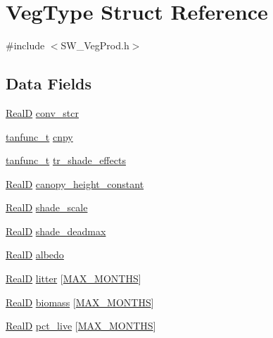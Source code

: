 \hypertarget{struct_veg_type}{}\section{Veg\+Type Struct Reference}
\label{struct_veg_type}


{\ttfamily \#include $<$S\+W\+\_\+\+Veg\+Prod.\+h$>$}

\subsection*{Data Fields}
\begin{DoxyCompactItemize}
\item 
\hyperlink{generic_8h_af1c105fd5732f70b91ddaeda0cc340e3}{RealD} \hyperlink{struct_veg_type_a5046a57c5d9c224a683182ee4c2997c4}{conv\+\_\+stcr}
\item 
\hyperlink{structtanfunc__t}{tanfunc\+\_\+t} \hyperlink{struct_veg_type_aac40e85a764b5b1efca9b21a8de7332a}{cnpy}
\item 
\hyperlink{structtanfunc__t}{tanfunc\+\_\+t} \hyperlink{struct_veg_type_af3afdd2c85788d6b6a4c1d91c0d3e483}{tr\+\_\+shade\+\_\+effects}
\item 
\hyperlink{generic_8h_af1c105fd5732f70b91ddaeda0cc340e3}{RealD} \hyperlink{struct_veg_type_a386cea6b73513d17ac0b87354922fd08}{canopy\+\_\+height\+\_\+constant}
\item 
\hyperlink{generic_8h_af1c105fd5732f70b91ddaeda0cc340e3}{RealD} \hyperlink{struct_veg_type_a81084955a7bb26a6856a846e53c1f9f0}{shade\+\_\+scale}
\item 
\hyperlink{generic_8h_af1c105fd5732f70b91ddaeda0cc340e3}{RealD} \hyperlink{struct_veg_type_aff715aa3ea34e7408699818553e6cc75}{shade\+\_\+deadmax}
\item 
\hyperlink{generic_8h_af1c105fd5732f70b91ddaeda0cc340e3}{RealD} \hyperlink{struct_veg_type_ac0050a00f702961caa7fead3d25485e9}{albedo}
\item 
\hyperlink{generic_8h_af1c105fd5732f70b91ddaeda0cc340e3}{RealD} \hyperlink{struct_veg_type_a88a2f9babc0cc68dbe22df58f193ccab}{litter} \mbox{[}\hyperlink{_times_8h_a9c97e6841188b672e984a4eba7479277}{M\+A\+X\+\_\+\+M\+O\+N\+T\+HS}\mbox{]}
\item 
\hyperlink{generic_8h_af1c105fd5732f70b91ddaeda0cc340e3}{RealD} \hyperlink{struct_veg_type_a48191a4cc8787965340dce0e05af21e7}{biomass} \mbox{[}\hyperlink{_times_8h_a9c97e6841188b672e984a4eba7479277}{M\+A\+X\+\_\+\+M\+O\+N\+T\+HS}\mbox{]}
\item 
\hyperlink{generic_8h_af1c105fd5732f70b91ddaeda0cc340e3}{RealD} \hyperlink{struct_veg_type_a9a61329df61a5decb05e795460f079dd}{pct\+\_\+live} \mbox{[}\hyperlink{_times_8h_a9c97e6841188b672e984a4eba7479277}{M\+A\+X\+\_\+\+M\+O\+N\+T\+HS}\mbox{]}

\end{DoxyCompactItemize}
